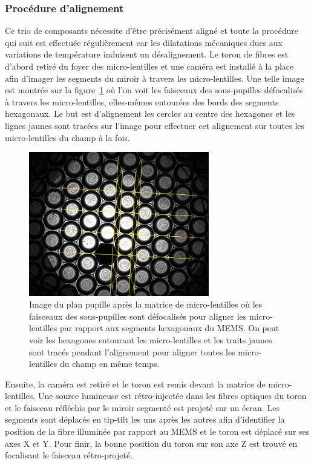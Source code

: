 \subsubsection{Procédure d'alignement}

Ce trio de composants nécessite d'être précisément aligné et toute la procédure qui suit est effectuée régulièrement car les dilatations mécaniques dues aux variations de température induisent un désalignement. Le toron de fibres est d'abord retiré du foyer des micro-lentilles et une caméra est installé à la place afin d'imager les segments du miroir à travers les micro-lentilles. Une telle image est montrée sur la figure~\ref{fig:MLAalignment} où l'on voit les faisceaux des sous-pupilles défocalisés à travers les micro-lentilles, elles-mêmes entourées des bords des segments hexagonaux. Le but est d'alignement les cercles au centre des hexagones et les lignes jaunes sont tracées sur l'image pour effectuer cet alignement sur toutes les micro-lentilles du champ à la fois.

\begin{figure}[ht!]
    \centering
    \includegraphics[width=0.7\textwidth]{Figure_Chap2/20191120_microlens_pupil_plane_2.jpg}
    \caption[Image du plan pupille après la matrice de micro-lentilles, prise lors de leur alignement par rapport au MEMS.]{Image du plan pupille après la matrice de micro-lentilles où les faisceaux des sous-pupilles sont défocalisés pour aligner les micro-lentilles par rapport aux segments hexagonaux du MEMS. On peut voir les hexagones entourant les micro-lentilles et les traits jaunes sont tracés pendant l'alignement pour aligner toutes les micro-lentilles du champ en même temps.}
    \label{fig:MLAalignment}
\end{figure}

Ensuite, la caméra est retiré et le toron est remis devant la matrice de micro-lentilles. Une source lumineuse est rétro-injectée dans les fibres optiques du toron et le faisceau réfléchis par le miroir segmenté est projeté sur un écran. Les segments sont déplacés en tip-tilt les uns après les autres afin d'identifier la position de la fibre illuminée par rapport au \ac{MEMS} et le toron est déplacé sur ses axes X et Y. Pour finir, la bonne position du toron sur son axe Z est trouvé en focalisant le faisceau rétro-projeté.


